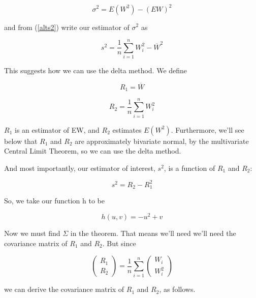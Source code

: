 \begin{equation}
\sigma^2 = E(W^2) -(EW)^2
\end{equation}  

and from (\ref{alts2}) write our estimator of $\sigma^2$ as

\begin{equation}
s^2 = \frac{1}{n} \sum_{i=1}^{n} W_i^2 - \overline{W}^2 
\end{equation}

This suggests how we can use the delta method.  We define

\begin{equation}
R_1 = \overline{W}
\end{equation}

\begin{equation}
R_2 = \frac{1}{n} \sum_{i=1}^{n} W_i^2 
\end{equation}

$R_1$ is an estimator of EW, and $R_2$ estimates $E(W^2)$.  Furthermore,
we'll see below that $R_1$ and $R_2$ are approximately bivariate normal,
by the multivariate Central Limit Theorem, so we can use the delta
method.  

And most importantly, our estimator of interest, $s^2$, is a
function of $R_1$ and $R_2$:

\begin{equation}
s^2 = R_2 - R_1^2
\end{equation}

So, we take our function h to be

\begin{equation}
h(u,v) = -u^2 + v
\end{equation}

Now we must find $\Sigma$ in the theorem.  That means we'll need we'll
need the covariance matrix of $R_1$ and $R_2$.  But since

\begin{equation}
\left (
   \begin{array}{l}
   R_1 \\
   R_2 
   \end{array} 
\right ) =
\frac{1}{n}
\sum_{i=1}^n  
\left (
   \begin{array}{l}
   W_i \\
   W_i^2 
   \end{array}
\right ) 
\end{equation}

we can derive the covariance matrix of $R_1$ and $R_2$, as follows.


